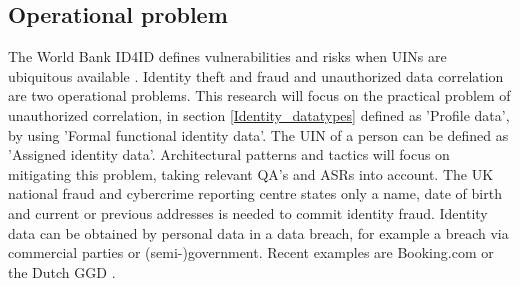 \subsection{Operational problem}
The World Bank ID4ID defines vulnerabilities and risks when UINs are ubiquitous available \cite{WorldBank_protecting}. Identity theft and fraud and unauthorized data correlation are two operational problems. This research will focus on the practical problem of unauthorized correlation, in section \ref{Identity_datatypes} defined as 'Profile data', by using 'Formal functional identity data'. The UIN of a person can be defined as 'Assigned identity data'. Architectural patterns and tactics will focus on mitigating this problem, taking relevant QA's and ASRs into account. 
The UK national fraud and cybercrime reporting centre states only a name, date of birth and current or previous addresses is needed to commit identity fraud. \cite{Action_fraud}
Identity data can be obtained by personal data in a data breach, for example a breach via commercial parties or (semi-)government. Recent examples are Booking.com \cite{Booking_databreach} or the Dutch GGD \cite{GGD_databreach}.


